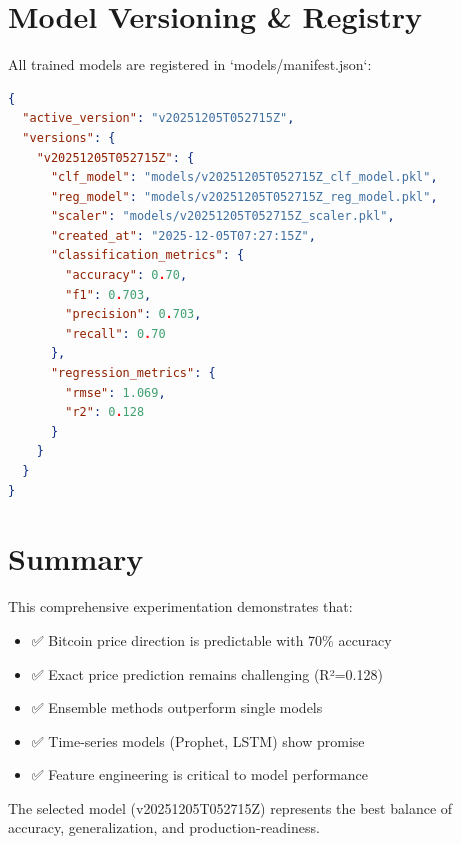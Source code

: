 \section{Model Versioning \& Registry}

All trained models are registered in `models/manifest.json`:

\begin{lstlisting}[language=json]
{
  "active_version": "v20251205T052715Z",
  "versions": {
    "v20251205T052715Z": {
      "clf_model": "models/v20251205T052715Z_clf_model.pkl",
      "reg_model": "models/v20251205T052715Z_reg_model.pkl",
      "scaler": "models/v20251205T052715Z_scaler.pkl",
      "created_at": "2025-12-05T07:27:15Z",
      "classification_metrics": {
        "accuracy": 0.70,
        "f1": 0.703,
        "precision": 0.703,
        "recall": 0.70
      },
      "regression_metrics": {
        "rmse": 1.069,
        "r2": 0.128
      }
    }
  }
}
\end{lstlisting}

\section{Summary}

This comprehensive experimentation demonstrates that:
\begin{itemize}
    \item ✅ Bitcoin price direction is predictable with 70\% accuracy
    \item ✅ Exact price prediction remains challenging (R²=0.128)
    \item ✅ Ensemble methods outperform single models
    \item ✅ Time-series models (Prophet, LSTM) show promise
    \item ✅ Feature engineering is critical to model performance
\end{itemize}

The selected model (v20251205T052715Z) represents the best balance of accuracy, generalization, and production-readiness.

